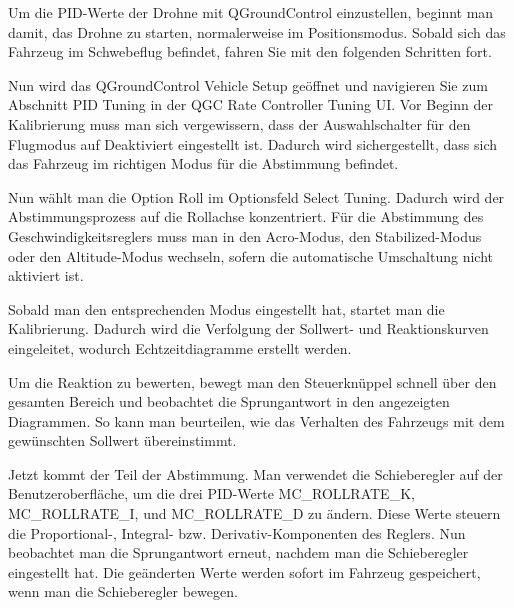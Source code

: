 Um die PID-Werte der Drohne mit QGroundControl einzustellen, beginnt man damit, das Drohne zu starten, normalerweise im Positionsmodus. Sobald sich das Fahrzeug im Schwebeflug befindet, fahren Sie mit den folgenden Schritten fort.

Nun wird  das QGroundControl Vehicle Setup geöffnet und navigieren Sie zum Abschnitt PID Tuning in der QGC Rate Controller Tuning UI. Vor Beginn der Kalibrierung muss man sich vergewissern, dass der Auswahlschalter für den Flugmodus auf Deaktiviert eingestellt ist. Dadurch wird sichergestellt, dass sich das Fahrzeug im richtigen Modus für die Abstimmung befindet.

Nun wählt man die Option Roll im Optionsfeld Select Tuning. Dadurch wird der Abstimmungsprozess auf die Rollachse konzentriert.
Für die Abstimmung des Geschwindigkeitsreglers muss man in den Acro-Modus, den Stabilized-Modus oder den Altitude-Modus wechseln, sofern die automatische Umschaltung nicht aktiviert ist.

Sobald man den entsprechenden Modus eingestellt hat, startet man die Kalibrierung. Dadurch wird die Verfolgung der Sollwert- und Reaktionskurven eingeleitet, wodurch Echtzeitdiagramme erstellt werden.

Um die Reaktion zu bewerten, bewegt man den Steuerknüppel schnell über den gesamten Bereich und beobachtet die Sprungantwort in den angezeigten Diagrammen. So kann man beurteilen, wie das Verhalten des Fahrzeugs mit dem gewünschten Sollwert übereinstimmt.

Jetzt kommt der Teil der Abstimmung. Man verwendet die Schieberegler auf der Benutzeroberfläche, um die drei PID-Werte MC\_ROLLRATE\_K, MC\_ROLLRATE\_I, und MC\_ROLLRATE\_D zu ändern. Diese Werte steuern die Proportional-, Integral- bzw. Derivativ-Komponenten des Reglers. Nun beobachtet man die Sprungantwort erneut, nachdem man die Schieberegler eingestellt hat. Die geänderten Werte werden sofort im Fahrzeug gespeichert, wenn man die Schieberegler bewegen.

